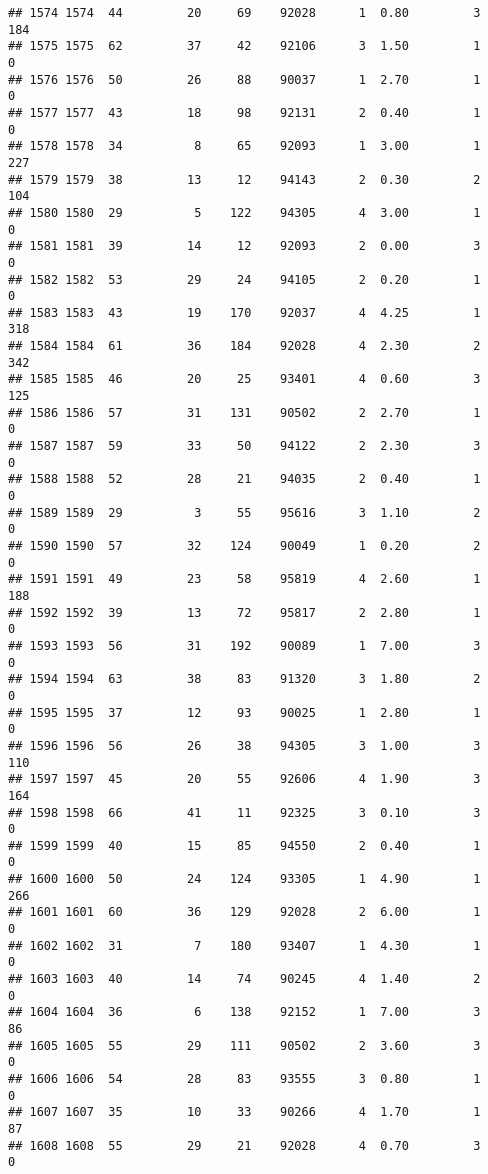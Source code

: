 \documentclass[
]{article}
\begin{document}
\begin{verbatim}
## 1574 1574  44         20     69    92028      1  0.80         3      184
## 1575 1575  62         37     42    92106      3  1.50         1        0
## 1576 1576  50         26     88    90037      1  2.70         1        0
## 1577 1577  43         18     98    92131      2  0.40         1        0
## 1578 1578  34          8     65    92093      1  3.00         1      227
## 1579 1579  38         13     12    94143      2  0.30         2      104
## 1580 1580  29          5    122    94305      4  3.00         1        0
## 1581 1581  39         14     12    92093      2  0.00         3        0
## 1582 1582  53         29     24    94105      2  0.20         1        0
## 1583 1583  43         19    170    92037      4  4.25         1      318
## 1584 1584  61         36    184    92028      4  2.30         2      342
## 1585 1585  46         20     25    93401      4  0.60         3      125
## 1586 1586  57         31    131    90502      2  2.70         1        0
## 1587 1587  59         33     50    94122      2  2.30         3        0
## 1588 1588  52         28     21    94035      2  0.40         1        0
## 1589 1589  29          3     55    95616      3  1.10         2        0
## 1590 1590  57         32    124    90049      1  0.20         2        0
## 1591 1591  49         23     58    95819      4  2.60         1      188
## 1592 1592  39         13     72    95817      2  2.80         1        0
## 1593 1593  56         31    192    90089      1  7.00         3        0
## 1594 1594  63         38     83    91320      3  1.80         2        0
## 1595 1595  37         12     93    90025      1  2.80         1        0
## 1596 1596  56         26     38    94305      3  1.00         3      110
## 1597 1597  45         20     55    92606      4  1.90         3      164
## 1598 1598  66         41     11    92325      3  0.10         3        0
## 1599 1599  40         15     85    94550      2  0.40         1        0
## 1600 1600  50         24    124    93305      1  4.90         1      266
## 1601 1601  60         36    129    92028      2  6.00         1        0
## 1602 1602  31          7    180    93407      1  4.30         1        0
## 1603 1603  40         14     74    90245      4  1.40         2        0
## 1604 1604  36          6    138    92152      1  7.00         3       86
## 1605 1605  55         29    111    90502      2  3.60         3        0
## 1606 1606  54         28     83    93555      3  0.80         1        0
## 1607 1607  35         10     33    90266      4  1.70         1       87
## 1608 1608  55         29     21    92028      4  0.70         3        0

\end{verbatim}
\end{document}
